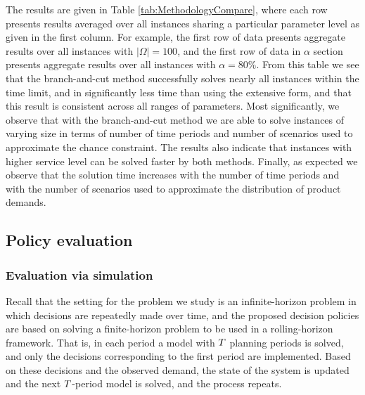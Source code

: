 \documentclass[msom]{oo}
\begin{document}
The results are given in Table \ref{tab:MethodologyCompare}, where each row presents results averaged over all instances sharing a particular parameter level as given in the first column. For example, the first row of data presents aggregate results over all instances with $|\Omega|=100$, and the first row of data in $\alpha$ section presents aggregate results over all instances with $\alpha=80\%$. From this table we see that the branch-and-cut method successfully solves nearly all instances within the time limit, and in significantly less time than using the extensive form, and that this result is consistent across all ranges of parameters. Most significantly, we observe that with the branch-and-cut method we are able to solve instances of varying size in terms of number of time periods and number of scenarios used to approximate the chance constraint.
The results also indicate that instances with higher service level can be solved faster by both methods. Finally, as expected we observe that the solution time increases with the number of time periods and with the number of scenarios used to approximate the distribution of product demands.





\subsection{Policy evaluation}

\subsubsection{Evaluation via simulation}
\label{Sec:Rolling}

Recall that the setting for the problem we study is an infinite-horizon problem in which decisions are repeatedly made over time, and the proposed decision policies are based on solving a finite-horizon problem to be used in a rolling-horizon framework. 
That is, in each period a model with $T$ planning periods is solved, and only the decisions corresponding to the first period are implemented. Based on these decisions and the observed demand, the state of the system is updated and the next $T$-period model is solved, and the process repeats. 
\end{document}
